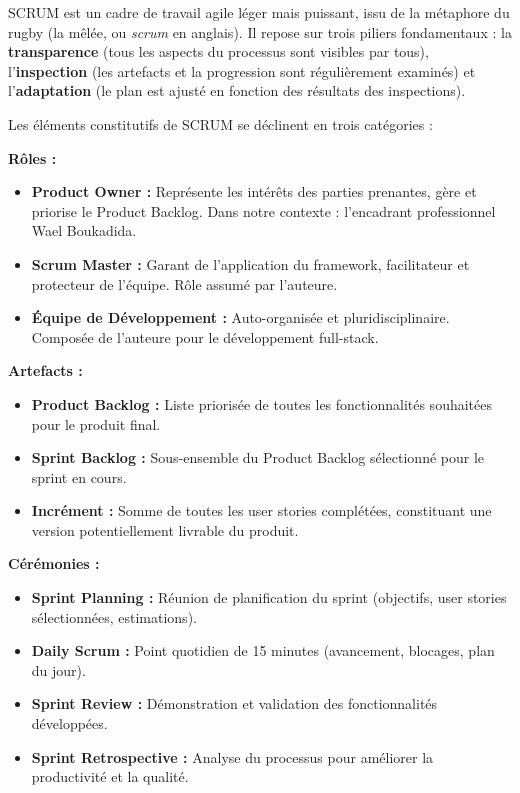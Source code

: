 \noindent SCRUM est un cadre de travail agile léger mais puissant, issu de la métaphore du rugby (la mêlée, ou \textit{scrum} en anglais). Il repose sur trois piliers fondamentaux : la \textbf{transparence} (tous les aspects du processus sont visibles par tous), l'\textbf{inspection} (les artefacts et la progression sont régulièrement examinés) et l'\textbf{adaptation} (le plan est ajusté en fonction des résultats des inspections).

\vspace{0.5cm}

\noindent Les éléments constitutifs de SCRUM se déclinent en trois catégories :

\textbf{Rôles :}
\begin{itemize}
  \item \textbf{Product Owner :} Représente les intérêts des parties prenantes, gère et priorise le Product Backlog. Dans notre contexte : l'encadrant professionnel Wael Boukadida.
  \item \textbf{Scrum Master :} Garant de l'application du framework, facilitateur et protecteur de l'équipe. Rôle assumé par l'auteure.
  \item \textbf{Équipe de Développement :} Auto-organisée et pluridisciplinaire. Composée de l'auteure pour le développement full-stack.
\end{itemize}

\textbf{Artefacts :}
\begin{itemize}
  \item \textbf{Product Backlog :} Liste priorisée de toutes les fonctionnalités souhaitées pour le produit final.
  \item \textbf{Sprint Backlog :} Sous-ensemble du Product Backlog sélectionné pour le sprint en cours.
  \item \textbf{Incrément :} Somme de toutes les user stories complétées, constituant une version potentiellement livrable du produit.
\end{itemize}

\textbf{Cérémonies :}
\begin{itemize}
  \item \textbf{Sprint Planning :} Réunion de planification du sprint (objectifs, user stories sélectionnées, estimations).
  \item \textbf{Daily Scrum :} Point quotidien de 15 minutes (avancement, blocages, plan du jour).
  \item \textbf{Sprint Review :} Démonstration et validation des fonctionnalités développées.
  \item \textbf{Sprint Retrospective :} Analyse du processus pour améliorer la productivité et la qualité.
  \vspace{0.7cm}
\end{itemize}

